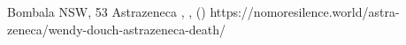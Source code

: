           {Bombala NSW, }
          {53}
          {Astrazeneca}
          {}
          {
            ,
            ,
             ()
          }
          {https://nomoresilence.world/astra-zeneca/wendy-douch-astrazeneca-death/}


